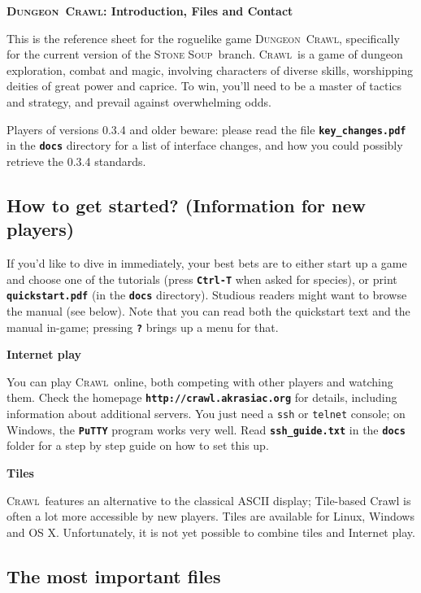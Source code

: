 \documentclass[a4paper,10pt]{article}
\newcommand{\key}[1]{{{\texttt{\textbf{#1}}}}} %
\newcommand{\sex}[1]{{{\textbf{#1}}}} %
\newcommand{\crawl}{\textsc{Crawl}}
\newcommand{\dungeon}{\textsc{Dungeon}}
\newcommand{\soup}{\textsc{Stone Soup}}
\newcommand{\para}{\vspace{1.5ex}}
\begin{document}
\begin{center}\textbf{\LARGE
\dungeon\ \crawl: Introduction, Files  and Contact
}\end{center}

This is the reference sheet for the roguelike game \dungeon\ \crawl,
specifically for the current version of the \soup\ branch. 
\crawl\ is a game of dungeon exploration, combat and magic, involving
characters of diverse skills, worshipping deities of great power and
caprice. To win, you'll need to be a master of tactics and strategy,
and prevail against overwhelming odds.

\para

Players of versions 0.3.4 and older beware: please read the file 
\key{key\_changes.pdf} in the \key{docs} directory for a list of
interface changes, and how you could possibly retrieve the 0.3.4
standards.

\subsection*{How to get started? (Information for new players)}

If you'd like to dive in immediately, your best bets are to either
start up a game and choose one of the tutorials (press \key{Ctrl-T} 
when asked for species), or print \key{quickstart.pdf} (in the 
\key{docs} directory). Studious readers might want to browse the 
manual  (see below). Note that you can read both the quickstart 
text and the manual in-game; pressing \key{?} brings up a menu for 
that.

\para

\sex{Internet play}

You can play \crawl\ online, both competing with other players and watching 
them. Check the homepage \key{http://crawl.akrasiac.org} for details, including 
information about additional servers. You just need a \texttt{ssh} or 
\texttt{telnet} console; on Windows, the \key{PuTTY} program works very 
well. Read \key{ssh\_guide.txt} in the \key{docs} folder for a step by step 
guide on how to set this up.

\para 

\sex{Tiles}

\crawl\ features an alternative to the classical ASCII display; Tile-based
Crawl is often a lot more accessible by new players. Tiles are available for 
Linux, Windows and OS X.
Unfortunately, it is not yet possible to combine tiles and Internet play.

\subsection*{The most important files}
\end{document}
